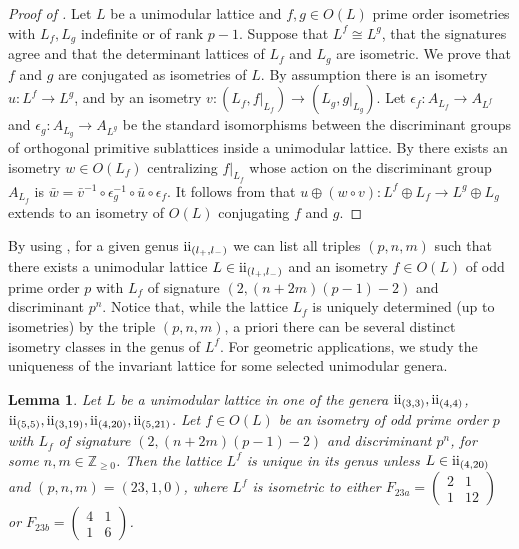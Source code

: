 \documentclass{amsart}
\theoremstyle{definition}
\theoremstyle{plain}
\newtheorem{lemma}[definition]{Lemma}
\newcommand{\IZ}{\mathbb{Z}}
\newcommand{\RN}[1]{\textup{\uppercase\expandafter{\romannumeral#1}}}
\newcommand{\even}{\RN{2}}
\begin{document}
\begin{proof}[Proof of ]
Let $L$ be a unimodular lattice and $f,g\in O(L)$ prime order
isometries with $L_f, L_g$ indefinite or of rank $p-1$. Suppose that $L^f\cong L^g$, that the signatures agree and that the determinant lattices of $L_f$ and $L_g$ are isometric.
We prove that $f$ and $g$ are conjugated as isometries of $L$.
By assumption there is an isometry $u\colon L^f \rightarrow L^g$, and by  an isometry $v\colon(L_f,f|_{L_f})\rightarrow (L_g,g|_{L_g})$.
Let $\epsilon_f\colon A_{L_f} \rightarrow A_{L^f}$ and
$\epsilon_g\colon A_{L_g} \rightarrow A_{L^g}$ be the standard
isomorphisms between the discriminant groups of
orthogonal primitive sublattices inside a unimodular lattice.
By  there exists an
isometry $w \in O(L_f)$ centralizing $f\vert_{L_f}$ whose action
on the discriminant group $A_{L_f}$ is
$\bar{w} = \bar{v}^{-1} \circ \epsilon_g^{-1} \circ \bar{u}
\circ \epsilon_f$. It follows from
\cite[Cor.\ 1.5.2]{nikulin} that
$u \oplus (w \circ v)\colon L^f \oplus L_f \rightarrow L^g
\oplus L_g$ extends to an isometry of $O(L)$ conjugating $f$
and $g$.
\end{proof}

By using , for a given genus $\even_{(l_+,l_-)}$ we can list all triples $(p,n,m)$ such that there exists a unimodular lattice $L \in \even_{(l_+,l_-)}$ and an isometry $f \in O(L)$ of odd prime order $p$ with $L_f$ of signature $(2, (n+2m)(p-1)-2)$ and discriminant $p^n$.
Notice that, while the lattice $L_f$ is uniquely determined (up to isometries) by the triple $(p,n,m)$, a priori there can be several distinct isometry classes in the genus of $L^f$. For geometric applications, we study the uniqueness of the invariant lattice for some selected unimodular genera.

\begin{lemma}\label{lem:uniqueness_L^G}
Let $L$ be a unimodular lattice in one of the genera
$\even_{(3,3)}, \even_{(4,4)}$, $\even_{(5,5)}, \even_{(3,19)},
\even_{(4,20)}, \even_{(5,21)}$. Let $f \in O(L)$
be an isometry of odd prime order $p$ with $L_f$
of signature $(2, (n+2m)(p-1)-2)$ and discriminant $p^n$,
for some $n,m \in \IZ_{\geq 0}$. Then the lattice $L^f$
is unique in its genus unless $L \in \even_{(4,20)}$
and $(p,n,m) = (23,1,0)$, where $L^f$ is isometric to either
$F_{23a} = \left(\begin{smallmatrix} 2 & 1 \\ 1 & 12 \end{smallmatrix}\right)$ or
$F_{23b} = \left(\begin{smallmatrix} 4 & 1 \\ 1 & 6 \end{smallmatrix}\right)$.
\end{lemma}
\end{document}
